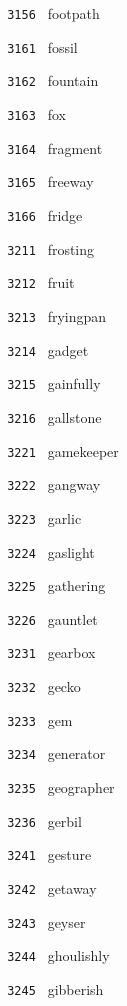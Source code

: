 \documentclass[11pt]{article}
\begin{document}
\begin{multicols}{6}
\noindent \texttt{ 3156 } footpath  \par
\vspace{3mm}
\noindent \texttt{ 3161 } fossil  \par
\noindent \texttt{ 3162 } fountain  \par
\noindent \texttt{ 3163 } fox  \par
\noindent \texttt{ 3164 } fragment  \par
\noindent \texttt{ 3165 } freeway  \par
\noindent \texttt{ 3166 } fridge  \par
\noindent \texttt{ 3211 } frosting  \par
\noindent \texttt{ 3212 } fruit  \par
\noindent \texttt{ 3213 } fryingpan  \par
\noindent \texttt{ 3214 } gadget  \par
\noindent \texttt{ 3215 } gainfully  \par
\noindent \texttt{ 3216 } gallstone  \par
\vspace{3mm}
\noindent \texttt{ 3221 } gamekeeper  \par
\noindent \texttt{ 3222 } gangway  \par
\noindent \texttt{ 3223 } garlic  \par
\noindent \texttt{ 3224 } gaslight  \par
\noindent \texttt{ 3225 } gathering  \par
\noindent \texttt{ 3226 } gauntlet  \par
\vspace{3mm}
\noindent \texttt{ 3231 } gearbox  \par
\noindent \texttt{ 3232 } gecko  \par
\noindent \texttt{ 3233 } gem  \par
\noindent \texttt{ 3234 } generator  \par
\noindent \texttt{ 3235 } geographer  \par
\noindent \texttt{ 3236 } gerbil  \par
\vspace{3mm}
\noindent \texttt{ 3241 } gesture  \par
\noindent \texttt{ 3242 } getaway  \par
\noindent \texttt{ 3243 } geyser  \par
\noindent \texttt{ 3244 } ghoulishly  \par
\noindent \texttt{ 3245 } gibberish  \par

\end{multicols}
\end{document}
